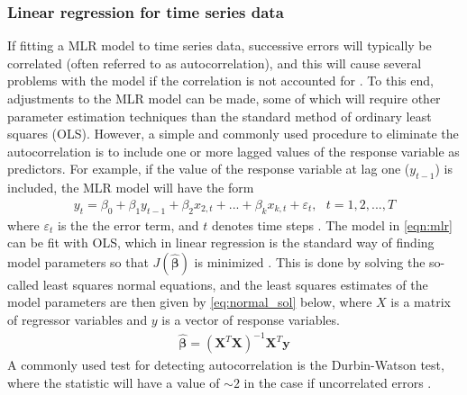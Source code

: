\subsubsection{Linear regression for time series data}
If fitting a MLR model to time series data, successive errors will typically be correlated (often referred to as autocorrelation), and this will cause several problems with the model if the correlation is not accounted for \cite{Montgomery2015}. To this end, adjustments to the MLR model can be made, some of which will require other parameter estimation techniques than the standard method of ordinary least squares (OLS). However, a simple and commonly used procedure to eliminate the autocorrelation is to include one or more lagged values of the response variable as predictors. For example, if the value of the response variable at lag one ($y_{t-1}$) is included, the MLR model will have the form 
\begin{align}
y_t = \beta_0 + \beta_{1} y_{t-1} + \beta_2 x_{2,t} + ... + \beta_{k} x_{k,t} + \varepsilon_t, \: \: \: t = 1, 2, ..., T
\label{eqn:mlr}
\end{align}
where $\varepsilon_t$ is the the error term, and $t$ denotes time steps \cite{Montgomery2015}. The model in \cref{eqn:mlr} can be fit with OLS, which in linear regression is the standard way of finding model parameters so that $J(\bm{\hat{\beta}})$ is minimized \cite{Montgomery2012}. This is done by solving the so-called least squares normal equations,
and the least squares estimates of the model parameters are then given by \cref{eq:normal_sol} below, where $X$ is a matrix of regressor variables and $y$ is a vector of response variables. 
\begin{align}
\bm{\hat{\beta}} = (\bm{X}^T\bm{X})^{-1}\bm{X}^T\bm{y}
\label{eq:normal_sol} 
\end{align}
A commonly used test for detecting autocorrelation is the Durbin-Watson test, where the statistic will have a value of $\sim 2$ in the case if uncorrelated errors \cite{Montgomery2015}. 

